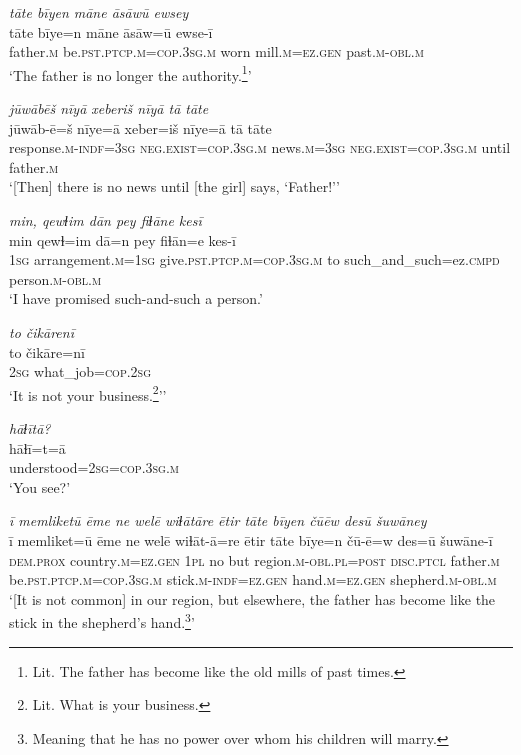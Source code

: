 \ea \label{RE.33}
\textit{tāte bīyen māne āsāwū ewsey} \\ 
\gll tāte bīye=n māne āsāw=ū ewse-ī \\ 
 father\textsc{.m} be\textsc{.pst}\textsc{.ptcp}\textsc{.m}\textsc{=cop}\textsc{.3sg}\textsc{.m} worn mill\textsc{.m}\textsc{=ez.gen} past\textsc{.m}\textsc{-obl}\textsc{.m} \\ 
\glt `The father is no longer the authority.\footnote{Lit. The father has become like the old mills of past times.}'
\z 
 
\ea \label{RE.34}
\textit{jūwābēš nīyā xeberiš nīyā tā tāte} \\ 
\gll jūwāb-ē=š nīye=ā xeber=iš nīye=ā tā tāte \\ 
 response\textsc{.m}\textsc{-indf}\textsc{=3sg} \textsc{\textsc{neg.}exist}\textsc{=cop}\textsc{.3sg}\textsc{.m} news\textsc{.m}\textsc{=3sg} \textsc{\textsc{neg.}exist}\textsc{=cop}\textsc{.3sg}\textsc{.m} until father\textsc{.m} \\ 
\glt `[Then] there is no news until [the girl] says, ‘Father!’'
\z 
 
\ea \label{RE.36}
\textit{min, qewɫim dān pey fiɫāne kesī} \\ 
\gll min qewɫ=im dā=n pey fiɫān=e kes-ī \\ 
 \textsc{1sg} arrangement\textsc{.m}\textsc{=\textsc{1sg}} give\textsc{.pst}\textsc{.ptcp}\textsc{.m}\textsc{=cop}\textsc{.3sg}\textsc{.m} to such\_and\_such=ez\textsc{.cmpd} person\textsc{.m}\textsc{-obl}\textsc{.m} \\ 
\glt `I have promised such-and-such a person.'
\z 
 
\ea \label{RE.39}
\textit{to čikārenī} \\ 
\gll to čikāre=nī \\ 
 \textsc{2sg} what\_job\textsc{=cop}\textsc{.\textsc{2sg}} \\ 
\glt `It is not your business.\footnote{Lit. What is your business.}’'
\z 
 
\ea \label{RE.40}
\textit{hāɫītā?} \\ 
\gll hāɫī=t=ā \\ 
 understood\textsc{=\textsc{2sg}}\textsc{=cop}\textsc{.3sg}\textsc{.m} \\ 
\glt `You see?'
\z 
 
\ea \label{RE.41}
\textit{ī memliketū ēme ne welē wiɫātāre ētir tāte bīyen čūēw desū šuwāney} \\ 
\gll ī memliket=ū ēme ne welē wiɫāt-ā=re ētir tāte bīye=n čū-ē=w des=ū šuwāne-ī \\ 
 \textsc{dem.prox} country\textsc{.m}\textsc{=ez.gen} \textsc{1pl} no but region\textsc{.m}\textsc{-obl}\textsc{.pl}\textsc{=\textsc{post}} \textsc{disc.ptcl} father\textsc{.m} be\textsc{.pst}\textsc{.ptcp}\textsc{.m}\textsc{=cop}\textsc{.3sg}\textsc{.m} stick\textsc{.m}\textsc{-indf}\textsc{=ez.gen} hand\textsc{.m}\textsc{=ez.gen} shepherd\textsc{.m}\textsc{-obl}\textsc{.m} \\ 
\glt `[It is not common] in our region, but elsewhere, the father has become like the stick in the shepherd’s hand.\footnote{Meaning that he has no power over whom his children will marry.}'
\z 
 
